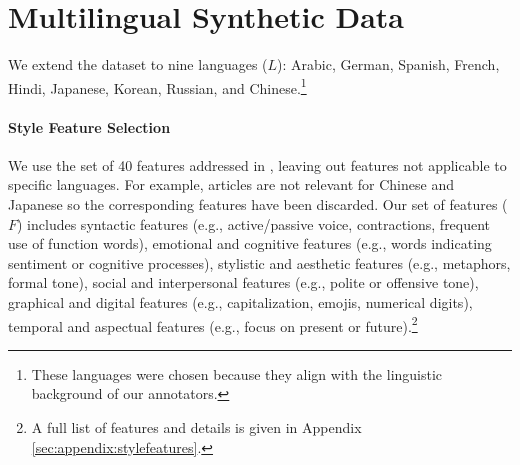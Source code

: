 \section{Multilingual Synthetic Data}

\label{sec:datageneration}
We extend the \citet{patel2024styledistancestrongercontentindependentstyle} dataset to nine languages ($L$): Arabic, German, Spanish, French, Hindi, Japanese, Korean, Russian, and Chinese.\footnote{These languages were chosen because they align with the linguistic background of our annotators.} %
\paragraph{Style Feature Selection}
We use the set of 40 features addressed in \citet{patel2024styledistancestrongercontentindependentstyle}, leaving out features not applicable to specific languages. For example, articles are not relevant for Chinese and Japanese so the corresponding features have been discarded. %
Our set of features ($F$) includes syntactic features (e.g., active/passive voice, contractions, frequent use of function words), emotional and cognitive features (e.g., words indicating sentiment or cognitive processes), stylistic and aesthetic features (e.g., metaphors, formal tone), social and interpersonal features (e.g., polite or offensive tone), graphical and digital features (e.g., capitalization, emojis, numerical digits), temporal and aspectual features (e.g., focus on present or future).\footnote{A full list of features and details is given in 
Appendix \ref{sec:appendix:stylefeatures}.} 

